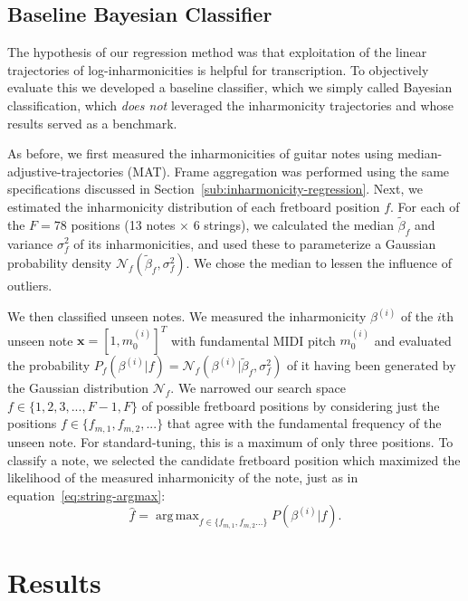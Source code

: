 \documentclass[convention,peer-reviewed]{aesconf}
\DeclareMathOperator*{\argmax}{arg\,max}
\begin{document}
\subsection{Baseline Bayesian Classifier}
The hypothesis of our regression method was that exploitation of the linear trajectories of log-inharmonicities is helpful for transcription. To objectively evaluate this we developed a baseline classifier, which we simply called Bayesian classification, which \textit{does not} leveraged the inharmonicity trajectories and whose results served as a benchmark.

As before, we first measured the inharmonicities of guitar notes using median-adjustive-trajectories (MAT). Frame aggregation was performed using the same specifications discussed in Section~\ref{sub:inharmonicity-regression}. Next, we estimated the inharmonicity distribution of each fretboard position $f$. For each of the $F=78$ positions (13 notes $\times$ 6 strings), we calculated the median $\tilde{\beta}_f$ and variance $\sigma^2_f$ of its inharmonicities, and used these to parameterize a Gaussian probability density $\mathcal{N}_f(\tilde{\beta}_f,\sigma^2_f)$. We chose the median to lessen the influence of outliers.

We then classified unseen notes. We measured the inharmonicity $\beta^{(i)}$ of the $i$th unseen note $\mathbf{x}=[1,m_0^{(i)}]^T$ with fundamental MIDI pitch $m_0^{(i)}$ and evaluated the probability $P_f(\beta^{(i)} | f) = \mathcal{N}_f(\beta^{(i)} | \tilde{\beta}_f,\sigma^2_f)$ of it having been generated by the Gaussian distribution $\mathcal{N}_f$. We narrowed our search space $f \in \{1,2,3,...,F-1,F\}$ of possible fretboard positions by considering just the positions $f \in \{f_{m,1},f_{m,2},...\}$ that agree with the fundamental frequency of the unseen note. For standard-tuning, this is a maximum of only three positions. To classify a note, we selected the candidate fretboard position which maximized the likelihood of the measured inharmonicity of the note, just as in equation~\eqref{eq:string-argmax}:
\begin{equation}
\hat{f} = \argmax_{f\in\{f_{m,1},f_{m,2}...\}}P(\beta^{(i)} | f).
\label{eq:string-classification-mle}
\end{equation}

\section{Results}  
\end{document}
